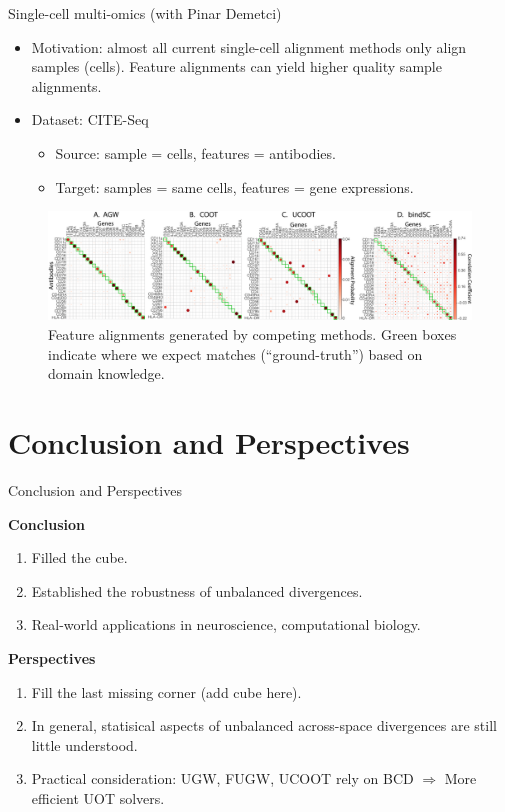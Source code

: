 \documentclass{beamer}
\begin{document}
\begin{frame}{Single-cell multi-omics (with Pinar Demetci)}
\scriptsize
\begin{itemize}
  \item Motivation: almost all current single-cell alignment methods only
  align samples (cells). Feature alignments can yield higher quality
  sample alignments.
  \item Dataset: CITE-Seq \parencite{CITEseq}
  \begin{itemize}
    \scriptsize
    \item Source: sample = cells, features = antibodies.
    \item Target: samples = same cells, features = gene expressions.
  \end{itemize}
\end{itemize}
\begin{figure}
  \centering
  \includegraphics[width=1.\linewidth, keepaspectratio=true]{OT_new/cite_fgcoot_final.pdf}
  \caption*{\scriptsize{Feature alignments generated by competing methods.
  Green boxes indicate where we expect matches (“ground-truth”)
  based on domain knowledge.}}
\end{figure}
\end{frame}

\section{Conclusion and Perspectives}
\begin{frame}{Conclusion and Perspectives}
\scriptsize

\textbf{Conclusion}
\begin{enumerate}
  \item Filled the cube.
  \item Established the robustness of unbalanced divergences.
  \item Real-world applications in neuroscience, computational biology.
\end{enumerate}

\vspace{1cm}
\textbf{Perspectives}
\begin{enumerate}
  \item Fill the last missing corner (add cube here).
  \item In general, statisical aspects of unbalanced across-space divergences
  are still little understood.
  \item Practical consideration: UGW, FUGW, UCOOT rely on BCD
  $\Rightarrow$ More efficient UOT solvers.
\end{enumerate}

\end{frame}
\end{document}
